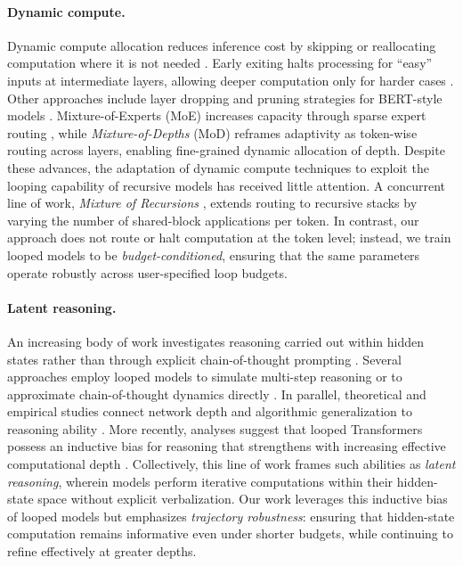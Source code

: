 \paragraph{Dynamic compute.}
Dynamic compute allocation reduces inference cost by skipping or reallocating computation where it is not needed \cite{bengio2015conditional, huang2016deep, panda2016conditional}. Early exiting halts processing for “easy” inputs at intermediate layers, allowing deeper computation only for harder cases \cite{elbayad2019depth, schuster2022confident, elhoushi2024layerskip}. Other approaches include layer dropping and pruning strategies for BERT-style models \cite{fan2019reducing, hou2020dynabert}. Mixture-of-Experts (MoE) increases capacity through sparse expert routing \cite{shazeer2017outrageously, fedus2022switch}, while \emph{Mixture-of-Depths} (MoD) \cite{raposo2024mixture} reframes adaptivity as token-wise routing across layers, enabling fine-grained dynamic allocation of depth. Despite these advances, the adaptation of dynamic compute techniques to exploit the looping capability of recursive models has received little attention. A concurrent line of work, \emph{Mixture of Recursions} \cite{bae2025mixture}, extends routing to recursive stacks by varying the number of shared-block applications per token. In contrast, our approach does not route or halt computation at the token level; instead, we train looped models to be \emph{budget-conditioned}, ensuring that the same parameters operate robustly across user-specified loop budgets.

\paragraph{Latent reasoning.}
An increasing body of work investigates reasoning carried out within hidden states rather than through explicit chain-of-thought prompting \cite{goyal2023think, cheng2024compressed, pfau2024let, kaissis2026stepresolveddataattributionlooped, chen2026loop,zhu2025scaling, jolicoeur2025less, wang2025hierarchical, zhang2025recursive, knupp2026depth, liang2026latent}. Several approaches employ looped models to simulate multi-step reasoning or to approximate chain-of-thought dynamics directly \cite{hao2024training, saunshi2025reasoning, wang2025hierarchical}. In parallel, theoretical and empirical studies connect network depth and algorithmic generalization to reasoning ability \cite{merrill2023expressive, chen2024can, ye2024physics, xu2025cot}. More recently, analyses suggest that looped Transformers possess an inductive bias for reasoning that strengthens with increasing effective computational depth \cite{saunshi2024inductive, saunshi2025reasoning}. Collectively, this line of work frames such abilities as \emph{latent reasoning}, wherein models perform iterative computations within their hidden-state space without explicit verbalization. Our work leverages this inductive bias of looped models but emphasizes \emph{trajectory robustness}: ensuring that hidden-state computation remains informative even under shorter budgets, while continuing to refine effectively at greater depths.


